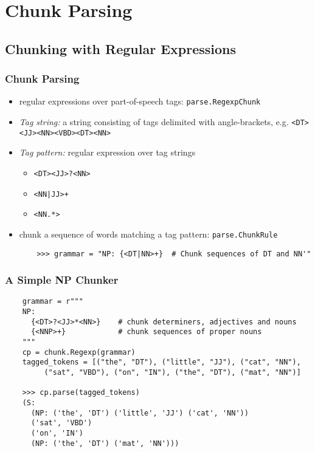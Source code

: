\documentclass{beamer}             %
\begin{document}
\section{Chunk Parsing}

\subsection{Chunking with Regular Expressions}

\begin{frame}[fragile]
  \frametitle{Chunk Parsing}
  \small

  \begin{itemize}
  \item regular expressions over part-of-speech tags: \texttt{parse.RegexpChunk}
  \item \textit{Tag string:} a string consisting of tags
    delimited with angle-brackets,
    e.g. \verb/<DT><JJ><NN><VBD><DT><NN>/
  \item \textit{Tag pattern:} regular expression over tag strings
    \begin{itemize}
    \item \verb/<DT><JJ>?<NN>/
    \item \verb/<NN|JJ>+/
    \item \verb/<NN.*>/
    \end{itemize}
  \item chunk a sequence of words matching a tag pattern: \texttt{parse.ChunkRule}

\begin{verbatim}
    >>> grammar = "NP: {<DT|NN>+}  # Chunk sequences of DT and NN'"
\end{verbatim}

  \end{itemize}
\end{frame}


\begin{frame}[fragile]
  \frametitle{A Simple NP Chunker}
  \scriptsize

\begin{verbatim}
    grammar = r"""
    NP:
      {<DT>?<JJ>*<NN>}    # chunk determiners, adjectives and nouns
      {<NNP>+}            # chunk sequences of proper nouns
    """
    cp = chunk.Regexp(grammar)
    tagged_tokens = [("the", "DT"), ("little", "JJ"), ("cat", "NN"),
         ("sat", "VBD"), ("on", "IN"), ("the", "DT"), ("mat", "NN")]

    >>> cp.parse(tagged_tokens)
    (S:
      (NP: ('the', 'DT') ('little', 'JJ') ('cat', 'NN'))
      ('sat', 'VBD')
      ('on', 'IN')
      (NP: ('the', 'DT') ('mat', 'NN')))
\end{verbatim}
\end{frame}
\end{document}
